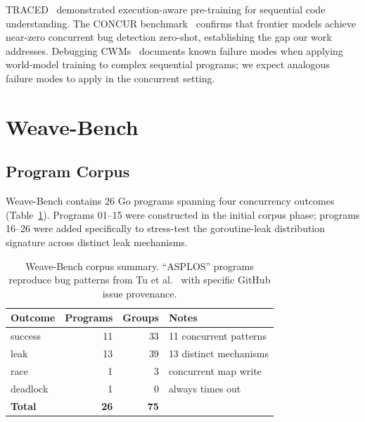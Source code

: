 \documentclass[sigconf,review,anonymous]{acmart}
\begin{document}
TRACED~\cite{traced2024} demonstrated execution-aware pre-training for sequential
code understanding. The CONCUR benchmark~\cite{concur2026} confirms that frontier
models achieve near-zero concurrent bug detection zero-shot, establishing the gap
our work addresses. Debugging CWMs~\cite{debugging_cwm2026} documents known
failure modes when applying world-model training to complex sequential programs;
we expect analogous failure modes to apply in the concurrent setting.

\section{Weave-Bench}
\label{sec:bench}

\subsection{Program Corpus}

Weave-Bench contains 26 Go programs spanning four concurrency outcomes
(Table~\ref{tab:programs}). Programs 01--15 were constructed in the initial
corpus phase; programs 16--26 were added specifically to stress-test the
goroutine-leak distribution signature across distinct leak mechanisms.

\begin{table}[h]
\centering
\caption{Weave-Bench corpus summary. ``ASPLOS'' programs reproduce bug patterns
from Tu et al.~\cite{tu2019understanding} with specific GitHub issue provenance.}
\label{tab:programs}
\begin{tabular}{lrrl}
\toprule
\textbf{Outcome} & \textbf{Programs} & \textbf{Groups} & \textbf{Notes} \\
\midrule
success  & 11 & 33 & 11 concurrent patterns \\
leak     & 13 & 39 & 13 distinct mechanisms \\
race     &  1 &  3 & concurrent map write \\
deadlock &  1 &  0 & always times out \\
\midrule
\textbf{Total} & \textbf{26} & \textbf{75} & \\
\bottomrule
\end{tabular}
\end{table}
\end{document}
